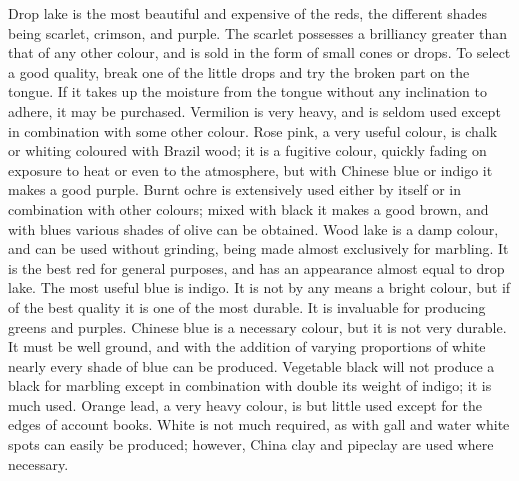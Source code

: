 \documentclass[twoside]{book}
\begin{document}
Drop lake is the most beautiful and expensive of
the reds, the different shades being scarlet,
crimson, and purple. The scarlet possesses a brilliancy
greater than that of any other colour, and is sold in
the form of small cones or drops. To select a good
quality, break one of the little drops and try the
broken part on the tongue. If it takes up the moisture
from the tongue without any inclination to
adhere, it may be purchased. Vermilion is very
heavy, and is seldom used except in combination
with some other colour. Rose pink, a very useful
colour, is chalk or whiting coloured with Brazil
wood; it is a fugitive colour, quickly fading on
exposure to heat or even to the atmosphere, but
with Chinese blue or indigo it makes a good purple.
Burnt ochre is extensively used either by itself or
in combination with other colours; mixed with
black it makes a good brown, and with blues various
shades of olive can be obtained. Wood lake is a
damp colour, and can be used without grinding,
being made almost exclusively for marbling. It is
the best red for general purposes, and has an
appearance almost equal to drop lake. The most
\pagebreak
useful blue is indigo. It is not by any means a
bright colour, but if of the best quality it is one of
the most durable. It is invaluable for producing
greens and purples. Chinese blue is a necessary
colour, but it is not very durable. It must be well
ground, and with the addition of varying proportions
of white nearly every shade of blue can be
produced. Vegetable black will not produce a
black for marbling except in combination with
double its weight of indigo; it is much used. Orange
lead, a very heavy colour, is but little used except
for the edges of account books. White is not much
required, as with gall and water white spots can
easily be produced; however, China clay and pipeclay
are used where necessary.
\end{document}
